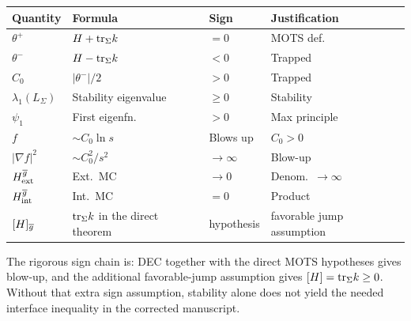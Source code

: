 \begin{center}
\renewcommand{\arraystretch}{1.2}
\footnotesize
\begin{tabular}{p{2.5cm}|p{3.5cm}|p{1.2cm}|p{3cm}}
\textbf{Quantity} & \textbf{Formula} & \textbf{Sign} & \textbf{Justification} \\
\hline
$\theta^+$ & $H + \mathrm{tr}_\Sigma k$ & $= 0$ & MOTS def. \\
$\theta^-$ & $H - \mathrm{tr}_\Sigma k$ & $< 0$ & Trapped \\
$C_0$ & $|\theta^-|/2$ & $> 0$ & Trapped \\
$\lambda_1(L_\Sigma)$ & Stability eigenvalue & $\ge 0$ & Stability \\
$\psi_1$ & First eigenfn. & $> 0$ & Max principle \\
$f$ & $\sim C_0 \ln s$ & Blows up & $C_0 > 0$ \\
$|\nabla f|^2$ & $\sim C_0^2/s^2$ & $\to\infty$ & Blow-up \\
$H^{\overline{g}}_{\text{ext}}$ & Ext.\ MC & $\to 0$ & Denom.\ $\to\infty$ \\
$H^{\overline{g}}_{\text{int}}$ & Int.\ MC & $= 0$ & Product \\
$[H]_{\overline{g}}$ & $\mathrm{tr}_\Sigma k$ in the direct theorem & hypothesis & favorable jump assumption \\
\hline
\end{tabular}
\normalsize
\end{center}

The rigorous sign chain is: DEC together with the direct MOTS hypotheses gives blow-up, and the additional favorable-jump assumption gives $[H]=\mathrm{tr}_\Sigma k\ge0$. Without that extra sign assumption, stability alone does not yield the needed interface inequality in the corrected manuscript.

